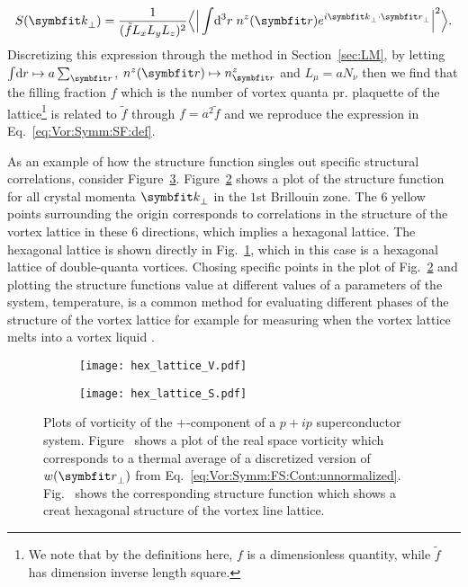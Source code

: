 \begin{equation}
    \label{eq:Vor:Symm:FS:Cont:structureFunction}
    S(\v{k}_\perp) = \frac{1}{(\tilde{f}L_xL_yL_z)^2}\Big\langle\Big|\int\!\mathrm{d}^3r\;n^z(\v{r})e^{i\v{k}_\perp\cdot\v{r}_\perp}\Big|^2\Big\rangle.
\end{equation}
Discretizing this expression through the method in Section~\ref{sec:LM}, \ie by letting $\int\!\mathrm{d}r\mapsto a\sum_\v{r}$, $n^z(\v{r})\mapsto n^z_\v{r}$ and $L_\mu = aN_\nu$ then
we find that the filling fraction $f$ which is the number of vortex quanta pr. plaquette of the lattice\footnote{We note that by the definitions here, $f$ is a dimensionless quantity, while $\tilde{f}$ has dimension inverse length square.} is related to $\tilde{f}$ through $f = a^2\tilde{f}$ and we reproduce the expression in
Eq.~\eqref{eq:Vor:Symm:SF:def}.

As an example of how the structure function singles out specific structural correlations, consider Figure~\ref{fig:Vor:Symm:SF:hex}. Figure~\ref{fig:Vor:Symm:SF:hex:S} shows a plot of the structure
function for all crystal momenta $\v{k}_\perp$ in the $1$st Brillouin zone. The $6$ yellow points surrounding the origin corresponds to correlations in the structure of the vortex lattice in these
$6$ directions, which implies a hexagonal lattice. The hexagonal lattice is shown directly in Fig.~\ref{fig:Vor:Symm:SF:hex:V}, which in this case is a hexagonal lattice of double-quanta vortices.
Chosing specific points in the plot of Fig.~\ref{fig:Vor:Symm:SF:hex:S} and plotting the structure functions value at different values of a parameters of the system, \eg temperature, is a common
method for evaluating different phases of the structure of the vortex lattice for example for measuring when the vortex lattice melts into a vortex liquid 
\cite{Smorgrav05,Smiseth05,NguyenPhase98,Nguyen96,NguyenOnsager98}.

\begin{figure}[h]
    \newcommand{\fractionwidth}{.45}
    \centering
    \begin{subfigure}[b]{\fractionwidth\textwidth}
        \centering
        \texttt{[image: hex\_lattice\_V.pdf]}
        \caption{\label{fig:Vor:Symm:SF:hex:V}}
    \end{subfigure}
    \hspace{2em}
    \begin{subfigure}[b]{\fractionwidth\textwidth}
        \centering
        \texttt{[image: hex\_lattice\_S.pdf]}
        \caption{\label{fig:Vor:Symm:SF:hex:S}}
    \end{subfigure}
    \caption{Plots of vorticity of the $+$-component of a $p+ip$ superconductor system. Figure~\protect{} shows a plot of the real space vorticity which corresponds to a thermal average of a discretized version of $w(\v{r}_\perp)$ from Eq.~\eqref{eq:Vor:Symm:FS:Cont:unnormalized}. Fig.~\protect{} shows the corresponding structure function which shows a creat hexagonal structure of the vortex line lattice.}
    \label{fig:Vor:Symm:SF:hex}
\end{figure}


